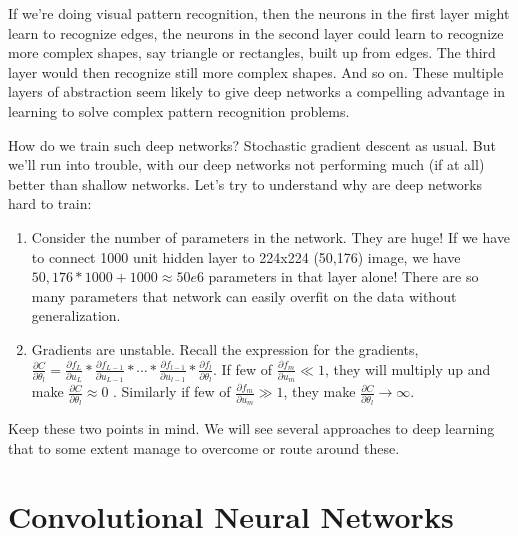 \documentclass[a4paper]{tufte-handout}
\begin{document}
If we're doing visual pattern recognition, then the neurons in the first
layer might learn to recognize edges, the neurons in the second layer
could learn to recognize more complex shapes, say triangle or
rectangles, built up from edges. The third layer would then recognize
still more complex shapes. And so on. These multiple layers of
abstraction seem likely to give deep networks a compelling advantage in
learning to solve complex pattern recognition problems.

How do we train such deep networks? Stochastic gradient descent as
usual. But we'll run into trouble, with our deep networks not performing
much (if at all) better than shallow networks.
Let's try to understand why are deep networks hard to train:

\begin{enumerate}
\item
  Consider the number of parameters in the network. They are huge! If we
  have to connect 1000 unit hidden layer to 224x224 (50,176) image, we
  have \(50,176*1000 + 1000 \approx 50e6\) parameters in that layer alone!
  There are so many parameters that network can easily overfit on the
  data without generalization.
\item
  Gradients are unstable. Recall the expression for the gradients,
  \(\frac{\partial C}{\partial \theta_l} = \frac{\partial f_L}{\partial u_L} * \frac{\partial f_{L-1}}{\partial u_{L-1}} * \cdots * \frac{\partial f_{l-1}}{\partial u_{l-1}} * \frac{\partial f_l}{\partial \theta_l}\).
  If few of \(\frac{\partial f_m}{\partial u_m} \ll 1\), they will
  multiply up and make
  \(\frac{\partial C}{\partial \theta_l} \approx 0\)
  . Similarly if few of
  \(\frac{\partial f_m}{\partial u_m} \gg 1\), they make
  \(\frac{\partial C}{\partial \theta_l} \to \infty\). 
\end{enumerate}

Keep these two points in mind. We will see several approaches to deep
learning that to some extent manage to overcome or route around these.


\section{Convolutional Neural
Networks}\label{convolutional-neural-networks}
\end{document}
